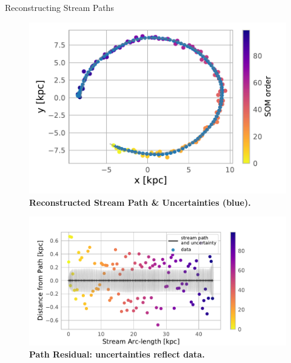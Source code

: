 \documentclass[final]{beamer}
\newlength{\colwidth}
\begin{document}
\begin{frame}[t]
\begin{columns}[t]
\begin{column}{\colwidth}
\begin{block}{Reconstructing Stream Paths}
        \begin{figure}
            \centering
            \caption{\normalsize{\textbf{Reconstructed Stream Path \& Uncertainties (blue).}} \label{fig:kalman_path}\vspace{-30pt}}
            \includegraphics[width=1.05\linewidth]{figures/kalman_path_xy.pdf}
        \end{figure}

        \vspace{-45pt}

        \begin{figure}
            \centering
            \caption{\normalsize{\textbf{Path Residual: uncertainties reflect data.}\label{fig:path_residual}} \vspace{-60pt}}
            \includegraphics[width=1.2\linewidth]{figures/path_residual.pdf}
        \end{figure}




\end{block}
\end{column}
\end{columns}
\end{frame}
\end{document}
